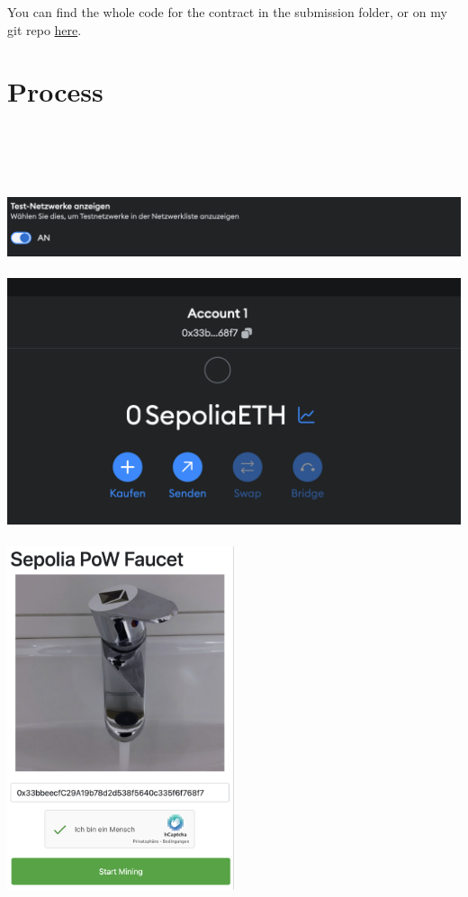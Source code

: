 \documentclass[14pt,a4paper]{extarticle}
\begin{document}
	\vspace{1cm}

	\noindent You can find the whole code for the contract in the submission folder, or on my git repo \href{https://github.com/benjaminellmer/mc-blockchains-exercises/blob/main/exercise03/contracts/Ex3Token.sol}{here}.

	\section{Process}
	 \\ \\
	 \\ \\
	\includegraphics[width=\textwidth]{images/show_test_networks.png}
	 \\ \\
	\includegraphics[width=\textwidth]{images/metamask_empty.png}
	 \\ \\
	\includegraphics[width=0.5\textwidth]{images/faucet.png}
\end{document}
